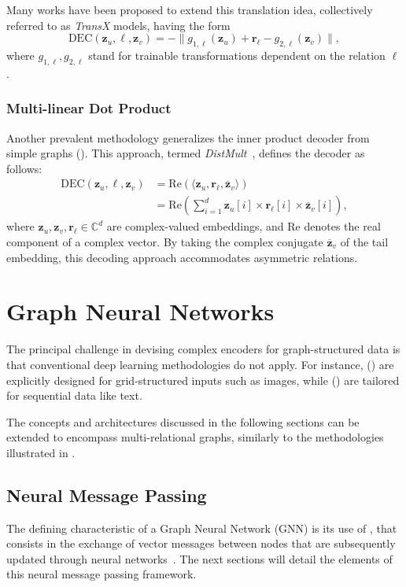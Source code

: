 Many works have been proposed to extend this translation idea, collectively referred to as \textit{TransX} models, having the form
\begin{equation*}
    \text{DEC}(\mathbf{z}_u, \ell, \mathbf{z}_v) = -\|g_{1,\ell}(\mathbf{z}_u) + \mathbf{r}_\ell - g_{2,\ell}(\mathbf{z}_v)\|,
\end{equation*}
where $ g_{1,\ell}, g_{2,\ell} $ stand for trainable transformations dependent on the relation $ \ell $.

\subsubsection{Multi-linear Dot Product}
Another prevalent methodology generalizes the inner product decoder from simple graphs (). This approach, termed \textit{DistMult}~\cite{Yang2014DistMult}, defines the decoder as follows:
\begin{align*}
\text{DEC}(\mathbf{z}_u, \ell, \mathbf{z}_v) &= \text{Re}(\langle \mathbf{z}_u, \mathbf{r}_\ell, \overline{\mathbf{z}}_v\rangle)\\
&= \text{Re}(\sum_{i=1}^d \mathbf{z}_u[i] \times \mathbf{r}_\ell[i] \times \overline{\mathbf{z}}_v[i]),
\end{align*}
where $ \mathbf{z}_u, \mathbf{z}_v, \mathbf{r}_\ell \in \mathbb{C}^d $ are complex-valued embeddings, and $ \text{Re} $ denotes the real component of a complex vector. By taking the complex conjugate $ \overline{\mathbf{z}}_v $ of the tail embedding, this decoding approach accommodates asymmetric relations.

\section{Graph Neural Networks}\label{sec:gnn}
The principal challenge in devising complex encoders for graph-structured data is that conventional deep learning methodologies do not apply. For instance,  () are explicitly designed for grid-structured inputs such as images, while  () are tailored for sequential data like text.

The concepts and architectures discussed in the following sections can be extended to encompass multi-relational graphs, similarly to the methodologies illustrated in .

\subsection{Neural Message Passing}
The defining characteristic of a Graph Neural Network (GNN) is its use of , that consists in the exchange of vector messages between nodes that are subsequently updated through neural networks~\cite{Gilmer2017neuralMessagePassing}. The next sections will detail the elements of this neural message passing framework.

